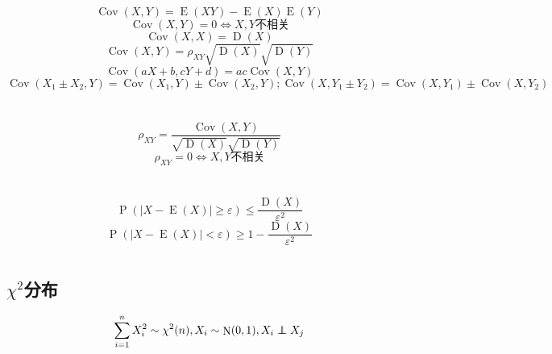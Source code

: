 \documentclass[]{article}
\numberwithin{equation}{section}
\DeclareMathOperator{\E}{E}
\DeclareMathOperator{\D}{D}
\DeclareMathOperator{\Cov}{Cov}
\DeclareMathOperator{\N}{N}
\newcommand\independent{\protect\mathpalette{\protect\independenT}{\perp}}
\def\independenT#1#2{\mathrel{\rlap{$#1#2$}\mkern2mu{#1#2}}}
\begin{document}
\section{}
\begin{equation}
    \Cov(X,Y)=\E(XY)-\E(X)\E(Y)
\end{equation}
\begin{equation}
    \Cov(X,Y)=0\iff X,Y\text{不相关}
\end{equation}
\begin{equation}
    \Cov(X,X)=\D(X)
\end{equation}
\begin{equation}
    \Cov(X,Y)=\rho_{XY}\sqrt{\D(X)}\sqrt{\D(Y)}
\end{equation}
\begin{equation}
    \Cov(aX+b,cY+d)=ac\Cov(X,Y)
\end{equation}
\begin{equation}
    \Cov(X_1\pm X_2,Y)=\Cov(X_1,Y)\pm \Cov(X_2,Y);\Cov(X,Y_1\pm Y_2)=\Cov(X,Y_1)\pm \Cov(X,Y_2)
\end{equation}

\section{}
\begin{equation}
    \rho_{XY}=\frac{\Cov(X,Y)}{\sqrt{\D(X)}\sqrt{\D(Y)}}
\end{equation}
\begin{equation}
    \rho_{XY}=0\iff X,Y\text{不相关}
\end{equation}

\section{}
\begin{equation}
    \operatorname{P}(\left|X-\E(X)\right|\ge\varepsilon)\le\frac{\D(X)}{\varepsilon^2}
\end{equation}
\begin{equation}
    \operatorname{P}(\left|X-\E(X)\right|<\varepsilon)\ge1-\frac{\D(X)}{\varepsilon^2}
\end{equation}

\section{}
\subsection{$\chi^2$分布}
\begin{equation}
    \sum_{i=1}^n X_i^2\sim\chi^2(n),X_i\sim\N(0,1),X_i\independent X_j
\end{equation}
\end{document}
